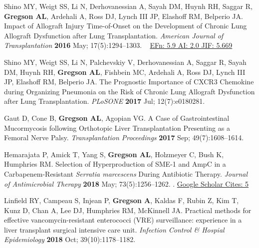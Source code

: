 \documentclass[letterpaper,10pt,sans,dvipsnames,final]{moderncv}%
\begin{document}
\begin{thebibliography}{1}
\bibitem[36]{} Shino MY, Weigt SS, Li N, Derhovanessian A, Sayah DM, Huynh RH, Saggar R, \textbf{Gregson AL}, Ardehali A, Ross DJ, Lynch III JP, Elashoff RM, Belperio JA. Impact of Allograft Injury Time-of-Onset on the Development of Chronic Lung Allograft Dysfunction after Lung Transplantation. {\color{BrickRed}\textit{American Journal of Transplantation}} \textbf{2016} May; 17(5):1294--1303. \href{http://onlinelibrary.wiley.com/doi/10.1111/ajt.14066/abstract}{\aiDoi}~
    {\color{NavyBlue}\href{http://52.6.43.8/projects/journalRank/rankings.php?bsearch=AMERICAN+JOURNAL+OF+TRANSPLANTATION&searchby=journal&orderby=eigenfactor}{{\smaller EFn: 5.9 AI: 2.0 JIF: 5.669}} 
       }

   \bibitem[37]{} Shino MY, Weigt SS, Li N, Palchevskiy V, Derhovanessian A, Saggar R, Sayah DM, Huynh RH, \textbf{Gregson AL}, Fishbein MC, Ardehali A, Ross DJ, Lynch III JP, Elashoff RM, Belperio JA. The Prognostic Importance of CXCR3 Chemokine during Organizing Pneumonia on the Risk of Chronic Lung Allograft Dysfunction after Lung Transplantation. {\color{BrickRed}\textit{PLoSONE}} \textbf{2017} Jul; 12(7):e0180281. \href{https://doi.org/10.1371/journal.pone.0180281}{\aiDoi}

  \bibitem[38]{} Gaut D, Cone B, \textbf{Gregson AL}, Agopian VG. A Case of Gastrointestinal Mucormycosis following Orthotopic Liver Transplantation Presenting as a Femoral Nerve Palsy. {\color{BrickRed}\textit{Transplantation Proceedings}} \textbf{2017} Sep; 49(7):1608--1614. \href{http://dx.doi.org/10.1016/j.transproceed.2017.03.074}{\aiDoi}

  \bibitem[38]{} Hemarajata P, Amick T, Yang S, \textbf{Gregson AL}, Holzmeyer C, Bush K, Humphries RM. Selection of Hyperproduction of SME-1 and AmpC in a Carbapenem-Resistant \textit{Serratia marcescens} During Antibiotic Therapy. {\color{BrickRed}\textit{Journal of Antimicrobial Therapy}} \textbf{2018} May; 73(5):1256--1262. \href{https://doi.org/10.1093/jac/dky028}{\aiDoi}.
    {\color{NavyBlue} \href{https://scholar.google.com/scholar?oi=bibs&hl=en&cites=12694396114418958483}{{\smaller Google Scholar Cites: 5}}
      }

  \bibitem[39]{} Linfield RY, Campeau S, Injean P, \textbf{Gregson A}, Kaldas F, Rubin Z, Kim T, Kunz D, Chan A, Lee DJ, Humphries RM, McKinnell JA. Practical methods for effective vancomycin-resistant enterococci (VRE) surveillance: experience in a liver transplant surgical intensive care unit. {\color{BrickRed}\textit{Infection Control \& Hospial Epidemiology}} \textbf{2018} Oct; 39(10):1178--1182. \href{https://doi.org/10.1017/ice.2018.178}{\aiDoi}


\end{thebibliography}
\end{document}
